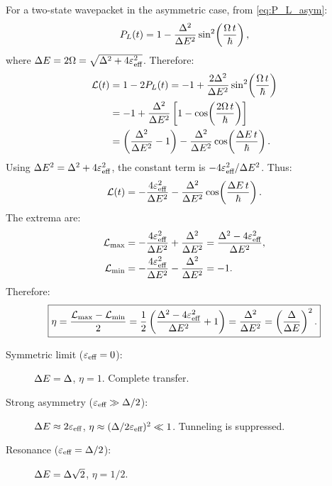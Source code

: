 For a two-state wavepacket in the asymmetric case, from \cref{eq:P_L_asym}:
\begin{equation}
  P_L(t) = 1 - \frac{\Delta^2}{\Delta E^2}\sin^2\!\left(\frac{\Omega\,t}{\hbar}\right),
\end{equation}
where $\Delta E = 2\Omega = \sqrt{\Delta^2 + 4\varepsilon_{\text{eff}}^2}$.
Therefore:
\begin{align}
  \mathcal{L}(t) &= 1 - 2P_L(t)
  = -1 + \frac{2\Delta^2}{\Delta E^2}\sin^2\!\left(\frac{\Omega\,t}{\hbar}\right)\notag\\
  &= -1 + \frac{\Delta^2}{\Delta E^2}\left[1 - \cos\!\left(\frac{2\Omega\,t}{\hbar}\right)\right]\notag\\
  &= \left(\frac{\Delta^2}{\Delta E^2} - 1\right) - \frac{\Delta^2}{\Delta E^2}\cos\!\left(\frac{\Delta E\,t}{\hbar}\right).
\end{align}
Using $\Delta E^2 = \Delta^2 + 4\varepsilon_{\text{eff}}^2$, the constant term is $-4\varepsilon_{\text{eff}}^2/\Delta E^2$.
Thus:
\begin{equation}\label{eq:L_twolevel}
  \mathcal{L}(t) = -\frac{4\varepsilon_{\text{eff}}^2}{\Delta E^2}
  - \frac{\Delta^2}{\Delta E^2}\cos\!\left(\frac{\Delta E\,t}{\hbar}\right).
\end{equation}
The extrema are:
\begin{align}
  \mathcal{L}_{\max} &= -\frac{4\varepsilon_{\text{eff}}^2}{\Delta E^2} + \frac{\Delta^2}{\Delta E^2}
  = \frac{\Delta^2 - 4\varepsilon_{\text{eff}}^2}{\Delta E^2},\\
  \mathcal{L}_{\min} &= -\frac{4\varepsilon_{\text{eff}}^2}{\Delta E^2} - \frac{\Delta^2}{\Delta E^2}
  = -1.
\end{align}
Therefore:
\begin{equation}\label{eq:eta_twolevel}
  \boxed{\eta = \frac{\mathcal{L}_{\max} - \mathcal{L}_{\min}}{2}
  = \frac{1}{2}\left(\frac{\Delta^2 - 4\varepsilon_{\text{eff}}^2}{\Delta E^2} + 1\right)
  = \frac{\Delta^2}{\Delta E^2}
  = \left(\frac{\Delta}{\Delta E}\right)^2.}
\end{equation}
\begin{description}
  \item[Symmetric limit ($\varepsilon_{\text{eff}} = 0$):] $\Delta E = \Delta$, $\eta = 1$. Complete transfer.
  \item[Strong asymmetry ($\varepsilon_{\text{eff}} \gg \Delta/2$):] $\Delta E \approx 2\varepsilon_{\text{eff}}$, $\eta \approx (\Delta/2\varepsilon_{\text{eff}})^2 \ll 1$. Tunneling is suppressed.
  \item[Resonance ($\varepsilon_{\text{eff}} = \Delta/2$):] $\Delta E = \Delta\sqrt{2}$, $\eta = 1/2$.
\end{description}

